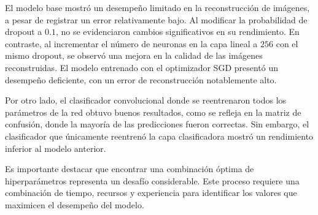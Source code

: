 \documentclass[aps,prl,reprint,groupedaddress]{revtex4-2}
\begin{document}
El modelo base mostró un desempeño limitado en la reconstrucción de imágenes, 
a pesar de registrar un error relativamente bajo. Al modificar la probabilidad 
de dropout a $0.1$, no se evidenciaron cambios significativos en su rendimiento. 
En contraste, al incrementar el número de neuronas en la capa lineal a $256$ 
con el mismo dropout, se observó una mejora en la calidad de las imágenes 
reconstruidas. El modelo entrenado con el optimizador SGD presentó un desempeño 
deficiente, con un error de reconstrucción notablemente alto. 

Por otro lado, el clasificador convolucional donde se reentrenaron todos los
parámetros de la red obtuvo buenos resultados, como se refleja en la matriz de 
confusión, donde la mayoría de las predicciones fueron correctas. Sin embargo, 
el clasificador que únicamente reentrenó la capa clasificadora mostró un 
rendimiento inferior al modelo anterior.

Es importante destacar que encontrar una combinación óptima de hiperparámetros 
representa un desafío considerable. Este proceso requiere una combinación de 
tiempo, recursos y experiencia para identificar los valores que maximicen el 
desempeño del modelo.




\end{document}
